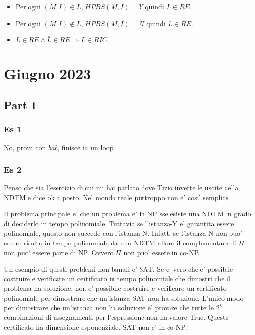 \documentclass[a4paper,10pt,oneside]{book}
\begin{document}
\begin{itemize}
    \item Per ogni $(M,I) \in L$, $HPBS(M, I) = Y$ quindi $L \in RE$.
    \item Per ogni $(M,I) \not \in L$, $HPBS(M, I) = N$ quindi $\overline L \in RE$.
    \item $L \in RE \land \overline L \in RE \Rightarrow L \in RIC$.
\end{itemize}

\chapter{Giugno 2023}

\section{Part 1}

\subsection{Es 1}

No, prova con $bab$, finisce in un loop.

\subsection{Es 2}

Penso che sia l'esercizio di cui mi hai parlato dove Tizio inverte le uscite della NDTM e dice ok a posto. Nel mondo reale purtroppo non e' cosi' semplice.

Il problema principale e' che un problema e' in NP sse esiste una NDTM in grado di deciderlo in tempo polinomiale. Tuttavia se l'istanza-Y e' garantita essere polinomiale, questo non succede con l'istanza-N. Infatti se l'istanza-N non puo' essere risolta in tempo polinomiale da una NDTM allora il complementare di $\Pi$ non puo' essere parte di NP. Ovvero $\Pi$ non puo' essere in co-NP.

Un esempio di questi problemi non banali e' SAT. Se e' vero che e' possibile costruire e verificare un certificato in tempo polinomiale che dimostri che il problema ha soluzione, non e' possibile costruire e verificare un certificato polinomiale per dimostrare che un'istanza SAT non ha soluzione. L'unico modo per dimostrare che un'istanza non ha soluzione e' provare che tutte le $2^k$ combinazioni di assegnamenti per l'espressione non ha valore True. Questo certificato ha dimensione esponenziale. SAT non e' in co-NP.
\end{document}
